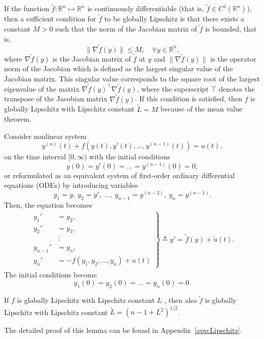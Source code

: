 \documentclass[preprint,12pt]{elsarticle}
\begin{document}
If the function \( \tilde f: \mathbb{R}^n \mapsto \mathbb{R}^n \) is continuously differentiable (that is, \( \tilde f \in C^1(\mathbb{R}^n) \)), then a sufficient condition for \( \tilde f \) to be globally Lipschitz is that there exists a constant \( M > 0 \) such that the norm of the Jacobian matrix of \( \tilde f \) is bounded, that is,
\[
\|\nabla \tilde f(y)\| \leq M, \quad \forall y \in \mathbb{R}^n,
\]
where \( \nabla \tilde f(y) \) is the Jacobian matrix of \( \tilde f \) at \( y \) and \( \| \nabla \tilde f(y) \| \) is the operator norm of the Jacobian which is defined as the largest singular value of the Jacobian matrix. This singular value corresponds to the square root of the largest eigenvalue of the matrix \( \nabla \tilde{f}(y)^\top \nabla \tilde{f}(y) \), where the superscript \( \top \) denotes the transpose of the Jacobian matrix \( \nabla \tilde{f}(y) \). If this condition is satisfied, then \( f \) is globally Lipschitz with Lipschitz constant \( \tilde L = M \) because of the mean value theorem.

Consider nonlinear system
\begin{equation}\label{nonlinear_system_n_order}
y^{(n)}(t) + f(y(t), y'(t), \dots, y^{(n-1)}(t)) = u(t),
\end{equation}
on the time interval \([0, \infty)\) with the initial conditions
\[
y(0) = y'(0) = \dots = y^{(n-1)}(0) = 0,
\]
or reformulated as an equivalent system of first-order ordinary differential equations (ODEs) by introducing variables
\[
y_1 = y, \ y_2 = y', \ \dots, \ y_{n-1} = y^{(n-2)},\ y_n = y^{(n-1)}.
\]
Then, the equation becomes
\begin{equation}\label{nonlinear_system_1_order}
\begin{aligned}
\left.
\begin{array}{ll}
y_1' &= y_2, \\
y_2' &= y_3, \\
&\ \vdots \\
y_{n-1}' &= y_n, \\
y_n' &= -f(y_1, y_2, \dots, y_n) + u(t)
\end{array}
\right\} \triangleq y'=\tilde f(y)+\tilde u(t).
\end{aligned}  
\end{equation}
The initial conditions become
\[
y_1(0) = y_2(0) = \dots = y_n(0) = 0.
\]
\begin{lem}\label{Lipschitz1}
If $f$ is globally Lipschitz with Lipschitz constant \(  L \) , then also $\tilde f$ is globally Lipschitz with Lipschitz constant  $\tilde L = ({n-1+L^2})^{1/2}$.
\end{lem}
\begin{pf}
The detailed proof of this lemma can be found in Appendix~\ref{app:Lipschitz}.
\end{pf}
\end{document}
